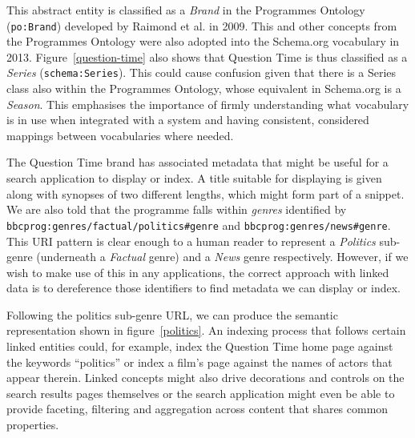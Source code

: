 This abstract entity is classified as a \emph{Brand} in the
Programmes Ontology\cite{raimond2009bbc} (\texttt{po:Brand})
developed by Raimond et al. in 2009. This and other concepts
from the Programmes Ontology were also adopted into the
Schema.org vocabulary in 2013.\cite{raimond2013schema}
Figure~\ref{question-time} also shows
that Question Time is thus classified as a \emph{Series}
(\texttt{schema:Series}). This could cause confusion given
that there is a Series class also within the Programmes Ontology,
whose equivalent in Schema.org is a \emph{Season}. This emphasises
the importance of firmly understanding what vocabulary is in use
when integrated with a system and having consistent, considered
mappings between vocabularies where needed.

The Question Time brand has associated metadata that might
be useful for a search application to display or index. A title
suitable for displaying is given along with synopses of two
different lengths, which might form part of a snippet. We are also
told that the programme falls within \emph{genres} identified
by \texttt{bbcprog:genres/factual/politics\#genre} and
\texttt{bbcprog:genres/news\#genre}. This URI pattern is
clear enough to a human reader to represent a \emph{Politics}
sub-genre (underneath a \emph{Factual} genre) and a
\emph{News} genre respectively. However, if we wish to make
use of this in any applications, the correct approach with
linked data is to dereference those identifiers to find
metadata we can display or index.

Following the politics sub-genre URL, we can produce the
semantic representation shown in figure~\ref{politics}.
An indexing process that follows certain linked entities
could, for example, index the Question Time home page
against the keywords ``politics'' or index a film's
page against the names of actors that appear therein.
Linked concepts might also drive decorations and controls
on the search results pages themselves or the search
application might even be able to provide faceting, filtering
and aggregation across content that shares common properties.

\begin{sidewaysfigure}
  \begin{center}
  \end{center}
  \caption{Semantic metadata around the \emph{Politics} programme genre}
  \label{politics}
\end{sidewaysfigure}

